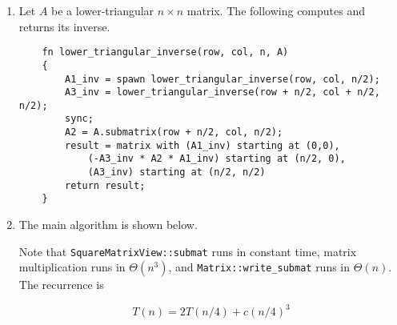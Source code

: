 \documentclass[11pt, letterpaper]{article}
\begin{document}
\thispagestyle{firststyle}


\begin{enumerate}
  \item Let $A$ be a lower-triangular $n \times n$ matrix. The following computes and returns its inverse.
  \begin{verbatim}
    fn lower_triangular_inverse(row, col, n, A)
    {
        A1_inv = spawn lower_triangular_inverse(row, col, n/2);
        A3_inv = lower_triangular_inverse(row + n/2, col + n/2, n/2);
        sync;
        A2 = A.submatrix(row + n/2, col, n/2); 
        result = matrix with (A1_inv) starting at (0,0),
            (-A3_inv * A2 * A1_inv) starting at (n/2, 0),
            (A3_inv) starting at (n/2, n/2)
        return result;
    } 
  \end{verbatim}

  \item The main algorithm is shown below.
  
  Note that \verb|SquareMatrixView::submat| runs in constant time, matrix multiplication runs in $\Theta(n^3)$, and \verb|Matrix::write_submat| runs in $\Theta(n)$. The recurrence is

  $$
  T(n) = 2T(n/4) + c(n/4)^3
  $$
\end{enumerate}
\end{document}
